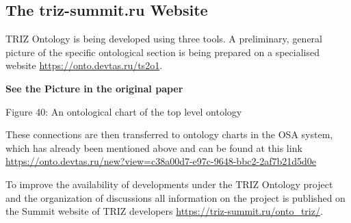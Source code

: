 \documentclass[11pt,a4paper]{article}
\newcommand{\addpicture}{\textbf{See the Picture in the original paper}\par}
\begin{document}
\subsection{The triz-summit.ru Website}

TRIZ Ontology is being developed using three tools.  A preliminary, general
picture of the specific ontological section is being prepared on a specialised
website \url{https://onto.devtas.ru/ts2o1}.
\begin{center}
  \addpicture
  Figure 40: An ontological chart of the top level ontology
\end{center}
These connections are then transferred to ontology charts in the OSA system,
which has already been mentioned above and can be found at this link
\url{https://onto.devtas.ru/new?view=c38a00d7-e97c-9648-bbc2-2af7b21d5d0e}

To improve the availability of developments under the TRIZ Ontology project
and the organization of discussions all information on the project is
published on the Summit website of TRIZ developers
\url{https://triz-summit.ru/onto_triz/}.
\end{document}
